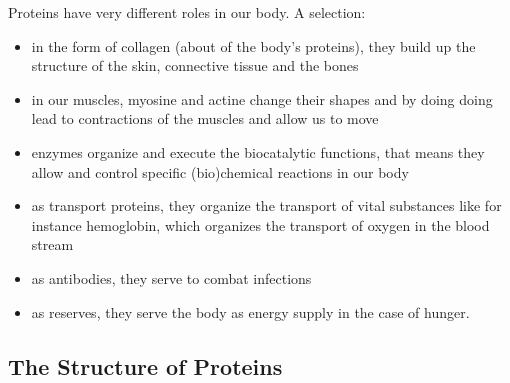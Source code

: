 \documentclass[../main.tex]{subfiles}
\begin{document}
Proteins have very different roles in our body. A selection:
\begin{itemize}
\item in the form of collagen (about  of the body's proteins), they build up the structure of the skin, connective tissue and the bones
\item in our muscles, myosine and actine change their shapes and by doing doing lead to contractions of the muscles and allow us to move
\item enzymes organize and execute the biocatalytic functions, that means they allow  and control specific (bio)chemical reactions in our body
\item as transport proteins, they organize the transport of vital substances like for instance hemoglobin, which organizes the transport of oxygen in the blood stream
\item as antibodies, they serve to combat infections
  \item as reserves, they serve the body as energy supply in the case of hunger.
  \end{itemize}

  \subsection{The Structure of Proteins}
  
\end{document}
